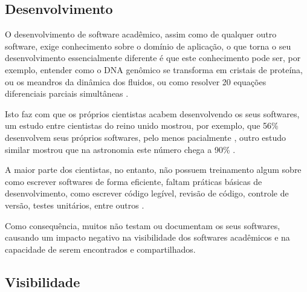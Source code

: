 \subsection{Desenvolvimento}

O desenvolvimento de software acadêmico, assim como de qualquer outro
software, exige conhecimento sobre o domínio de aplicação, o que torna o
seu desenvolvimento essencialmente diferente é que este conhecimento pode ser,
por exemplo, entender como o DNA genômico se transforma em cristais de
proteína, ou os meandros da dinâmica dos fluidos, ou como resolver 20 equações
diferenciais parciais simultâneas \cite{segal2008developing}.

Isto faz com que os próprios cientistas acabem desenvolvendo os seus softwares,
um estudo entre cientistas do reino unido mostrou, por exemplo, que 56\%
desenvolvem seus próprios softwares, pelo menos pacialmente
\cite{hettrick_2014_14809}, outro estudo similar mostrou que na astronomia este
número chega a 90\% \cite{momcheva2015software}.

A maior parte dos cientistas, no entanto, não possuem treinamento algum sobre
como escrever softwares de forma eficiente, faltam práticas básicas de
desenvolvimento, como escrever código legível, revisão de código, controle de
versão, testes unitários, entre outros \cite{wilson2017good}.

%

Como consequência, muitos não testam ou documentam os seus softwares, causando
um impacto negativo na visibilidade dos softwares acadêmicos \cite{howison2013,
katz2014transitive} e na capacidade de serem encontrados e compartilhados.


\subsection{Visibilidade}

